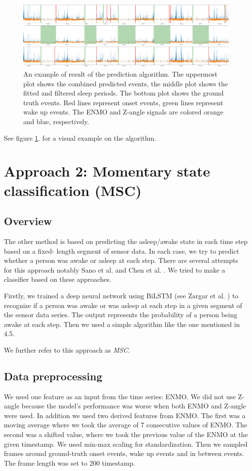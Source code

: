 \documentclass{article}
\begin{document}
\begin{figure}
    \centering
    \includegraphics[width=\textwidth]{cpd_prediction_plot.png}
    \caption{An example of result of the prediction algorithm. The uppermost plot shows the combined predicted events, the middle plot shows the fitted and filtered sleep periods. The bottom plot shows the ground truth events. Red lines represent onset events, green lines represent wake up events. The ENMO and Z-angle signals are colored orange and blue, respectively.}
    \label{fig:cpd-prediction-algorithm}
\end{figure}

See figure \ref{fig:cpd-prediction-algorithm}. for a visual example on the algorithm.

\section{Approach 2: Momentary state classification (MSC)}
\subsection{Overview}

The other method is based on predicting the asleep/awake state in each time step based on a fixed-
length segment of sensor data. In each case, we try to predict whether a person was awake or asleep at each step. There are several attempts for this approach notably Sano et al. \cite{sano19} and Chen et al. \cite{chen21}. We tried to make a classifier based on these approaches.

Firstly, we trained a deep neural network using BiLSTM (see Zargar et al. \cite{zargar21}) to recognize if a person was awake or was asleep at each step in a given segment of the sensor data series. The output represents the probability of a person being awake at each step. Then we used a simple algorithm like the one mentioned in 4.5.

We further refer to this approach as \textit{MSC}.

\subsection{Data preprocessing}
We used one feature as an input from the time series: ENMO. We did not use Z-angle because the model's performance was worse when both ENMO and Z-angle were used. In addition we used two derived features from ENMO. The first was a moving average where we took the average of 7 consecutive values of ENMO. The second was a shifted value, where we took the previous value of the ENMO at the given timestamp. We used min-max scaling for standardization. Then we sampled frames around ground-truth onset events, wake up events and in between events. The frame length was set to 200 timestamp.
\end{document}
